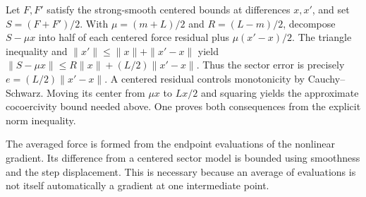 \documentclass[11pt,a4paper]{article}
\begin{document}
Let \(F,F'\) satisfy the strong-smooth centered bounds at differences \(x,x'\), and set \(S=(F+F')/2\). With \(\mu=(m+L)/2\) and \(R=(L-m)/2\), decompose \(S-\mu x\) into half of each centered force residual plus \(\mu(x'-x)/2\). The triangle inequality and \(\|x'\|\le\|x\|+\|x'-x\|\) yield \(\|S-\mu x\|\le R\|x\|+(L/2)\|x'-x\|\). Thus the sector error is precisely \(e=(L/2)\|x'-x\|\). A centered residual controls monotonicity by Cauchy–Schwarz. Moving its center from \(\mu x\) to \(Lx/2\) and squaring yields the approximate cocoercivity bound needed above. One proves both consequences from the explicit norm inequality.



The averaged force is formed from the endpoint evaluations of the nonlinear gradient. Its difference from a centered sector model is bounded using smoothness and the step displacement. This is necessary because an average of evaluations is not itself automatically a gradient at one intermediate point.
\end{document}

